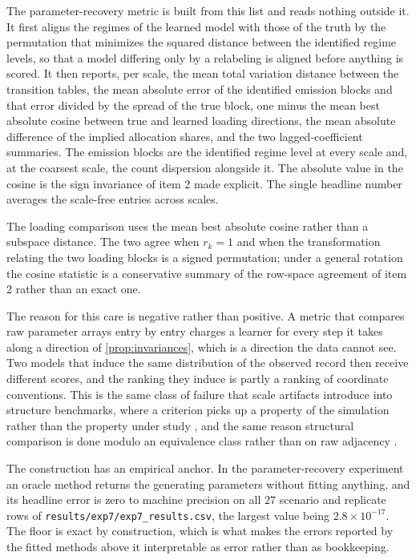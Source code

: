 The parameter-recovery metric is built from this list and reads nothing outside
it. It first aligns the regimes of the learned model with those of the truth by
the permutation that minimizes the squared distance between the identified
regime levels, so that a model differing only by a relabeling is aligned before
anything is scored. It then reports, per scale, the mean total variation
distance between the transition tables, the mean absolute error of the
identified emission blocks and that error divided by the spread of the true
block, one minus the mean best absolute cosine between true and learned loading
directions, the mean absolute difference of the implied allocation shares, and
the two lagged-coefficient summaries. The emission blocks are the identified
regime level at every scale and, at the coarsest scale, the count dispersion
alongside it. The absolute value in the cosine is the sign invariance of item 2
made explicit. The single headline number averages the scale-free entries
across scales.

\begin{remark}
The loading comparison uses the mean best absolute cosine rather than a
subspace distance. The two agree when $r_k = 1$ and when the transformation
relating the two loading blocks is a signed permutation; under a general
rotation the cosine statistic is a conservative summary of the row-space
agreement of item 2 rather than an exact one.
\end{remark}

The reason for this care is negative rather than positive. A metric that
compares raw parameter arrays entry by entry charges a learner for every step
it takes along a direction of \cref{prop:invariances}, which is a direction the
data cannot see. Two models that induce the same distribution of the observed
record then receive different scores, and the ranking they induce is partly a
ranking of coordinate conventions. This is the same class of failure that scale
artifacts introduce into structure benchmarks, where a criterion picks up a
property of the simulation rather than the property under study
\citep{reisach2021varsortability,reisach2023r2sortability}, and the same reason
structural comparison is done modulo an equivalence class rather than on raw
adjacency \citep{peters2015sid,runge2018pitfalls}.

The construction has an empirical anchor. In the parameter-recovery experiment
an oracle method returns the generating parameters without fitting anything,
and its headline error is zero to machine precision on all $27$ scenario and
replicate rows of \texttt{results/exp7/exp7\_results.csv}, the largest value
being $2.8 \times 10^{-17}$. The floor is exact by construction, which is what
makes the errors reported by the fitted methods above it interpretable as
error rather than as bookkeeping.

